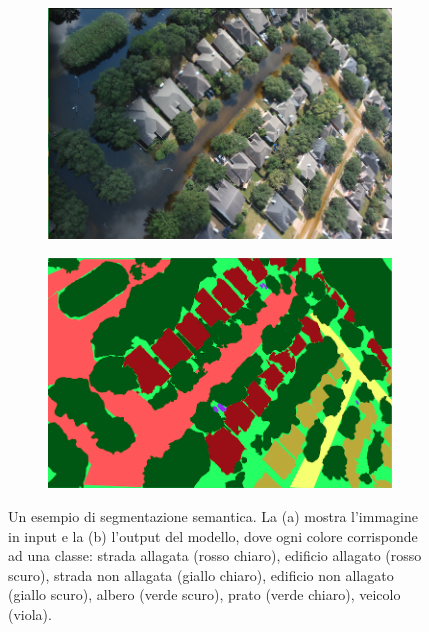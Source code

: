 \begin{figure}[h!]
 \centering
 \begin{subfigure}[b]{0.45\textwidth}
     \centering
     \includegraphics[width=\textwidth]{img/sem_seg copia 2.png}
     \caption{}
     \label{}
 \end{subfigure}
 \hfill
 \begin{subfigure}[b]{0.45\textwidth}
     \centering
     \includegraphics[width=\textwidth]{img/sem_seg copia.png}
     \caption{}
     \label{fig:bottleneck}
 \end{subfigure}
    \caption{Un esempio di segmentazione semantica. La (a) mostra l'immagine in input e la (b) l'output del modello, dove ogni colore corrisponde ad una classe: strada allagata (rosso chiaro), edificio allagato (rosso scuro), strada non allagata (giallo chiaro), edificio non allagato (giallo scuro), albero (verde scuro), prato (verde chiaro), veicolo (viola).}
    \label{fig:semseg}
\end{figure}
















